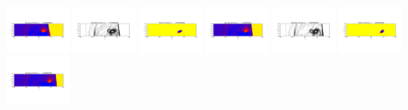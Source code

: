 \documentclass[11pt]{article}
\begin{document}
\includegraphics[width=0.15833333333333333\textwidth]{frame0008fig2.png}
\includegraphics[width=0.15833333333333333\textwidth]{frame0009fig0.png}
\includegraphics[width=0.15833333333333333\textwidth]{frame0009fig1.png}
\includegraphics[width=0.15833333333333333\textwidth]{frame0009fig2.png}
\vskip 10pt 
\includegraphics[width=0.15833333333333333\textwidth]{frame0010fig0.png}
\includegraphics[width=0.15833333333333333\textwidth]{frame0010fig1.png}
\includegraphics[width=0.15833333333333333\textwidth]{frame0010fig2.png}
\end{document}
